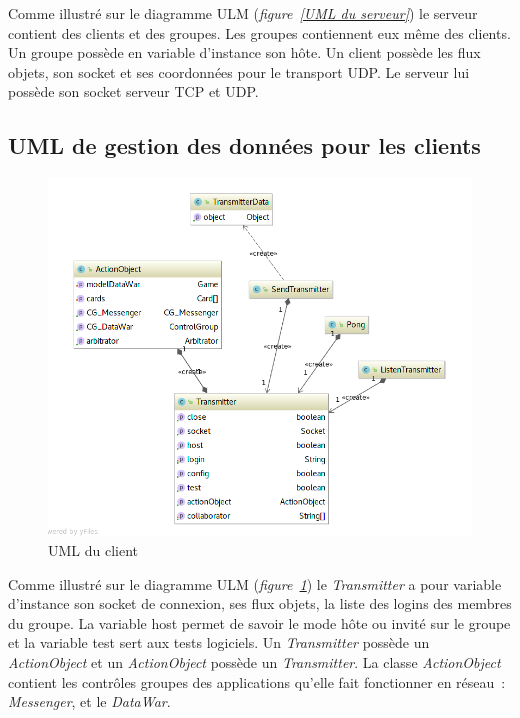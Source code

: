 \documentclass[a4paper,11pt]{report}
\begin{document}
    
    Comme illustré sur le diagramme ULM (\textit{figure~\ref{UML du serveur}}) le serveur contient des clients et des groupes. Les groupes contiennent eux même des clients. Un groupe possède en variable d’instance son hôte. Un client possède les flux objets, son socket et ses coordonnées pour le transport UDP. Le serveur lui possède son socket serveur TCP et UDP.


\subsection{UML de gestion des données pour les clients}
 \begin{figure}[th]
      \begin{center}
        \includegraphics[scale=0.3]{Assets/UML_client.png}
        \caption{UML du client}
        \label{UML du client}
      \end{center}
    \end{figure}
    
  Comme illustré sur le diagramme ULM (\textit{figure~\ref{UML du client}}) le \textit{Transmitter} a pour variable d’instance son socket de connexion, ses flux objets, la liste des logins des membres du groupe. La variable host permet de savoir le mode hôte ou invité sur le groupe et la variable test sert aux tests logiciels. Un \textit{Transmitter} possède un \textit{ActionObject} et un \textit{ActionObject} possède un \textit{Transmitter}. La classe \textit{ActionObject} contient les contrôles groupes des applications qu’elle fait fonctionner en réseau : \textit{Messenger}, et le \textit{DataWar}.
\end{document}
